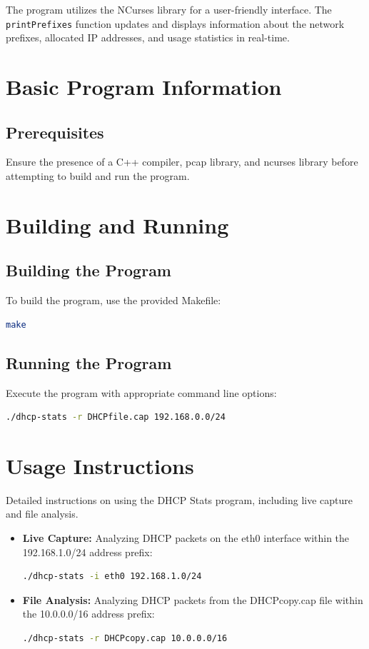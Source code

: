 \documentclass[a4paper]{article}
\begin{document}
The program utilizes the NCurses library for a user-friendly interface. The \texttt{printPrefixes} function updates and displays information about the network prefixes, allocated IP addresses, and usage statistics in real-time.

\section{Basic Program Information}
\subsection{Prerequisites}
Ensure the presence of a C++ compiler, pcap library, and ncurses library before attempting to build and run the program.
\section{Building and Running}
\subsection{Building the Program}
To build the program, use the provided Makefile:
\begin{lstlisting}[language=bash]
make
\end{lstlisting}

\subsection{Running the Program}
Execute the program with appropriate command line options:
\begin{lstlisting}[language=bash]
./dhcp-stats -r DHCPfile.cap 192.168.0.0/24
\end{lstlisting}

\section{Usage Instructions}
Detailed instructions on using the DHCP Stats program, including live capture and file analysis.

\begin{itemize}[label=]
    \item \textbf{Live Capture:} \newline Analyzing DHCP packets on the eth0 interface within the 192.168.1.0/24 address prefix:
    \begin{lstlisting}[language=bash]
        ./dhcp-stats -i eth0 192.168.1.0/24
    \end{lstlisting}

    \item \textbf{File Analysis:} \newline Analyzing DHCP packets from the DHCPcopy.cap file within the 10.0.0.0/16 address prefix:
    
    \begin{lstlisting}[language=bash]
        ./dhcp-stats -r DHCPcopy.cap 10.0.0.0/16
    \end{lstlisting}
    
\end{itemize}
\end{document}
